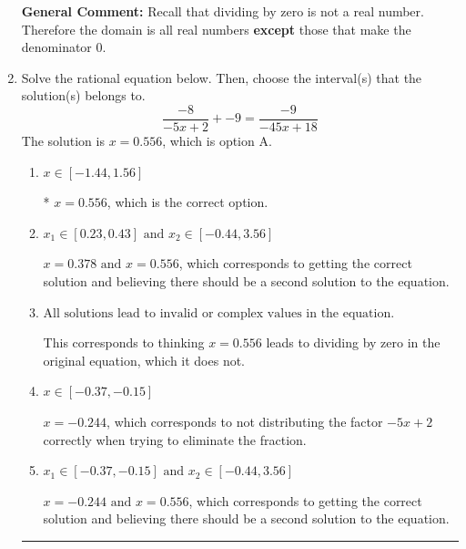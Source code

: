 \documentclass{extbook}[14pt]
\newcommand{\litem}[1]{\item #1

\rule{\textwidth}{0.4pt}}
\begin{document}
\begin{enumerate}
{\textbf{General Comment:} Recall that dividing by zero is not a real number. Therefore the domain is all real numbers \textbf{except} those that make the denominator 0.
}
\litem{
Solve the rational equation below. Then, choose the interval(s) that the solution(s) belongs to.
\[ \frac{-8}{-5x + 2} + -9 = \frac{-9}{-45x + 18} \]The solution is \( x = 0.556 \), which is option A.\begin{enumerate}[label=\Alph*.]
\item \( x \in [-1.44,1.56] \)

* $x = 0.556$, which is the correct option.
\item \( x_1 \in [0.23, 0.43] \text{ and } x_2 \in [-0.44,3.56] \)

$x = 0.378 \text{ and } x = 0.556$, which corresponds to getting the correct solution and believing there should be a second solution to the equation.
\item \( \text{All solutions lead to invalid or complex values in the equation.} \)

This corresponds to thinking $x = 0.556$ leads to dividing by zero in the original equation, which it does not.
\item \( x \in [-0.37,-0.15] \)

$x = -0.244$, which corresponds to not distributing the factor $-5x + 2$ correctly when trying to eliminate the fraction.
\item \( x_1 \in [-0.37, -0.15] \text{ and } x_2 \in [-0.44,3.56] \)

$x = -0.244 \text{ and } x = 0.556$, which corresponds to getting the correct solution and believing there should be a second solution to the equation.
\end{enumerate}

}
\end{enumerate}
\end{document}
